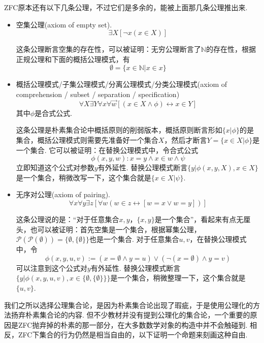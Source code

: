 \textsf{ZFC}原本还有以下几条公理，不过它们是多余的，能被上面那几条公理推出来. 
\begin{itemize}
    \item  空集公理(axiom of empty set).
    \[\exists X[\neg x(x \in X)]\]
    \begin{note}
        这条公理断言空集的存在性，可以被证明：无穷公理断言了\(\mathbb{N}\)的存在性，根据正规公理和下面的概括公理模式，有
        \[\emptyset = \{x \in \mathbb{N}|x \in x\}\]
    \end{note}
    \item  概括公理模式/子集公理模式/分离公理模式/分类公理模式(axiom of comprehension / subset / separation / specification)
    \[\forall X \exists Y \forall x \forall \vec{w}[(x \in X \wedge \phi) \leftrightarrow x \in Y]\]
    其中\(\phi\)是合式公式.
    \begin{note}
        这条公理是朴素集合论中概括原则的削弱版本，概括原则断言形如\(\{x|\phi\}\)的是集合，概括公理模式则需要先准备好一个集合\(X\)，然后才断言\(Y = \{x \in X|\phi\}\)是一个集合. 它可以被证明：在替换公理模式中，令合式公式
        \[\phi(x,y,w) : x=y \wedge x \in w \wedge \psi\]
        立即知道这个公式对参数\(y\)有外延性. 替换公理模式断言\(\{y|\phi(x,y,X), x \in X\}\)是一个集合，稍微改写一下，这个集合就是\(\{x \in X| \psi\}\).
    \end{note}
    \item  无序对公理(axiom of pairing).
    \[\forall x \forall y \exists z[\forall w(w \in z \leftrightarrow [w=x \vee w=y])]\]
    \begin{note}
        这条公理说的是：“对于任意集合\(x,y\)，\(\{x,y\}\)是一个集合”，看起来有点无厘头，也可以被证明：首先空集是一个集合，根据幂集公理，\(\mathcal{P}(\mathcal{P}(\emptyset)) = \{\emptyset,\{\emptyset\}\}\)也是一个集合. 对于任意集合\(u,v\)，在替换公理模式中，令
        \[\phi(x,y,u,v) := (x = \emptyset \wedge y = u) \vee (\neg (x =\emptyset) \wedge y = v)\]
        可以注意到这个公式对\(y\)有外延性. 替换公理模式断言\(\{y | \phi(x,y,u,v), x \in \{\emptyset,\{\emptyset\}\}\}\)是一个集合，稍微整理一下，这个集合就是\(\{u,v\}\).
    \end{note}
\end{itemize}

我们之所以选择公理集合论，是因为朴素集合论出现了瑕疵，于是使用公理化的方法扬弃朴素集合论的内容. 但不少教材并没有提到公理化的集合论，一个重要的原因是\textsf{ZFC}抛弃掉的朴素的那一部分，在大多数数学对象的构造中并不会触碰到. 相反，\textsf{ZFC}下集合的行为仍然是相当自由的，以下证明一个命题来刻画这种自由.


